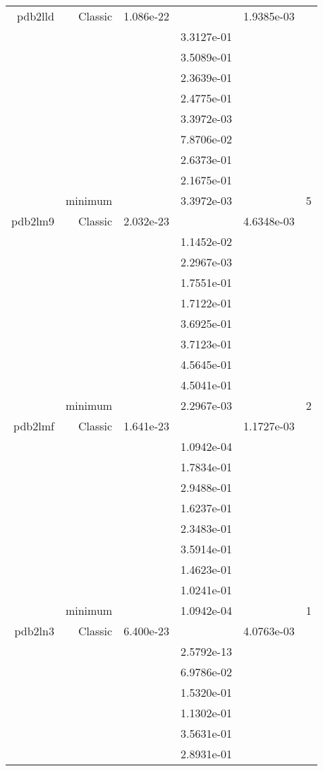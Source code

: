 \begin{xltabular}{\textwidth}{r|rS[table-format=1.3e+2]S[table-format=1.4e+2]S[table-format=1.4e+2]S[table-format=-1.5]}
pdb2lld & Classic & 1.086e-22 &  & 1.9385e-03 & \\
&  &  & 3.3127e-01 & & \\
&  &  & 3.5089e-01 & & \\
&  &  & 2.3639e-01 & & \\
&  &  & 2.4775e-01 & & \\
&  &  & 3.3972e-03 & & \\
&  &  & 7.8706e-02 & & \\
&  &  & 2.6373e-01 & & \\
&  &  & 2.1675e-01 & & \\
& minimum &  & 3.3972e-03 & & 5 \\  \addlinespace
pdb2lm9 & Classic & 2.032e-23 &  & 4.6348e-03 & \\
&  &  & 1.1452e-02 & & \\
&  &  & 2.2967e-03 & & \\
&  &  & 1.7551e-01 & & \\
&  &  & 1.7122e-01 & & \\
&  &  & 3.6925e-01 & & \\
&  &  & 3.7123e-01 & & \\
&  &  & 4.5645e-01 & & \\
&  &  & 4.5041e-01 & & \\
& minimum &  & 2.2967e-03 & & 2 \\  \addlinespace
pdb2lmf & Classic & 1.641e-23 &  & 1.1727e-03 & \\
&  &  & 1.0942e-04 & & \\
&  &  & 1.7834e-01 & & \\
&  &  & 2.9488e-01 & & \\
&  &  & 1.6237e-01 & & \\
&  &  & 2.3483e-01 & & \\
&  &  & 3.5914e-01 & & \\
&  &  & 1.4623e-01 & & \\
&  &  & 1.0241e-01 & & \\
& minimum &  & 1.0942e-04 & & 1 \\  \addlinespace
pdb2ln3 & Classic & 6.400e-23 &  & 4.0763e-03 & \\
&  &  & 2.5792e-13 & & \\
&  &  & 6.9786e-02 & & \\
&  &  & 1.5320e-01 & & \\
&  &  & 1.1302e-01 & & \\
&  &  & 3.5631e-01 & & \\
&  &  & 2.8931e-01 & & \\

\end{xltabular}
